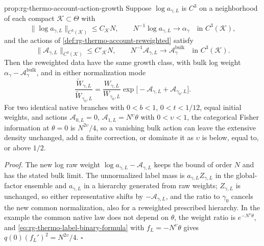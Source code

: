 {prop:rg-thermo-account-action-growth}
Suppose $\log a_{\gamma,L}$ is $C^3$ on a neighborhood of each compact
$\mathcal K\subset\Theta$ with
\begin{equation}
 \|\log a_{\gamma,L}\|_{C^3(\mathcal K)}\leq C_{\mathcal K}N,
 \qquad N^{-1}\log a_{\gamma,L}\longrightarrow\alpha_\gamma
                       \quad\text{in }C^3(\mathcal K),
 \label{eq:rg-thermo-account-raw-growth}
\end{equation}
and the actions of \cref{def:rg-thermo-account-reweighted} satisfy
\begin{equation}
 \|\mathscr A_{\gamma,L}\|_{C^3(\mathcal K)}\leq C'_{\mathcal K}N,
 \qquad N^{-1}\mathscr A_{\gamma,L}
       \longrightarrow\mathscr A_\gamma^{\mathrm{bulk}}
                       \quad\text{in }C^3(\mathcal K).
 \label{eq:rg-thermo-account-action-admission}
\end{equation}
Then the reweighted data have the same growth class, with bulk log weight
$\alpha_\gamma-\mathscr A_\gamma^{\mathrm{bulk}}$, and in either normalization
mode
\begin{equation}
 \frac{\widetilde W_{\gamma,L}}{\widetilde W_{\gamma_0,L}}
 =\frac{W_{\gamma,L}}{W_{\gamma_0,L}}
   \exp\bigl[-\mathscr A_{\gamma,L}
                   +\mathscr A_{\gamma_0,L}\bigr].
 \label{eq:rg-thermo-account-relative-action}
\end{equation}
For two identical native branches with $0<b<1$, $0<t<1/12$, equal initial
weights, and actions $\mathscr A_{0,L}=0$, $\mathscr A_{1,L}=N^\upsilon\theta$
with $0<\upsilon<1$, the categorical Fisher information at $\theta=0$ is
$N^{2\upsilon}/4$, so a vanishing bulk action can leave the extensive density
unchanged, add a finite correction, or dominate it as $\upsilon$ is below,
equal to, or above $1/2$. 

\noindent\emph{Proof.}
The new log raw weight $\log a_{\gamma,L}-\mathscr A_{\gamma,L}$ keeps the
bound of order $N$ and has the stated bulk limit. The unnormalized label mass
is $a_{\gamma,L}Z_{\gamma,L}$ in the global-factor ensemble and $a_{\gamma,L}$
in a hierarchy generated from raw weights; $Z_{\gamma,L}$ is unchanged, so
either representative shifts by $-\mathscr A_{\gamma,L}$, and the ratio to
$\gamma_0$ cancels the new common normalization, also for a reweighted
prescribed hierarchy. In the example the common native law does not depend on
$\theta$, the weight ratio is $e^{-N^\upsilon\theta}$, and
\cref{eq:rg-thermo-label-binary-formula} with $f_L=-N^\upsilon\theta$ gives
$q(0)(f_L')^2=N^{2\upsilon}/4$. $\square$

